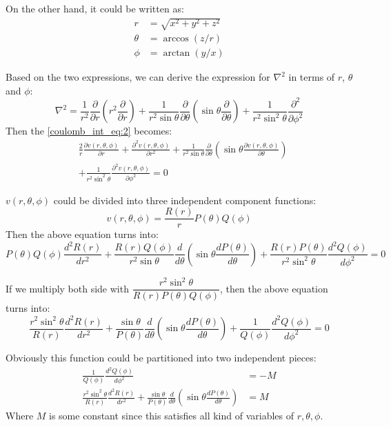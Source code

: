 On the other hand, it could be written as:
\begin{align}
 r &= \sqrt{x^{2} + y^{2} + z^{2}}  \nonumber \\
 \theta &= \arccos (z/r) \nonumber \\
 \phi   &= \arctan (y/x)
\end{align}

Based on the two expressions, we can derive the expression for $\nabla^{2}$
in terms of $r$, $\theta$ and $\phi$:
\begin{equation}
 \nabla^{2} = \frac{1}{r^{2}}\frac{\partial}{\partial r}(r^{2}
 \frac{\partial}{\partial r}) +
\frac{1}{r^{2}\sin \theta}\frac{\partial}{\partial \theta}
(\sin \theta \frac{\partial}{\partial \theta}) +
\frac{1}{r^{2}\sin^{2} \theta}\frac{\partial^{2}}{\partial \phi^{2}}
\end{equation}
Then the \ref{coulomb_int_eq:2} becomes:
\begin{align}
 &\frac{2}{r}\frac{\partial v(r,\theta,\phi)}{\partial r} +
 \frac{\partial^{2} v(r,\theta,\phi)}{\partial r^{2}} +
\frac{1}{r^{2}\sin \theta}\frac{\partial }{\partial \theta}
(\sin \theta \frac{\partial v(r,\theta,\phi)}{\partial \theta}) \nonumber \\
&+ \frac{1}{r^{2}\sin^{2} \theta}\frac{\partial^{2} v(r,\theta,\phi)}{\partial \phi^{2}} = 0
\end{align}

$v(r,\theta,\phi)$ could be divided into three independent component
functions:
\begin{equation}
 v(r,\theta,\phi) = \frac{R(r)}{r}P(\theta)Q(\phi)
\end{equation}
Then the above equation turns into:
\begin{equation}
 P(\theta)Q(\phi) \frac{d^{2} R(r)}{dr^{2}} +
 \frac{R(r)Q(\phi)}{r^{2}\sin \theta}\frac{d }{d \theta}
(\sin \theta \frac{d P(\theta)}{d \theta}) +
\frac{R(r)P(\theta)}{r^{2}\sin^{2} \theta}\frac{d^{2} Q(\phi)}{d \phi^{2}} = 0
\end{equation}

If we multiply both side with $\dfrac{r^{2}\sin^{2} \theta}{R(r)P(\theta)Q(\phi)}$,
then the above equation turns into:
\begin{equation}
\frac{r^{2}\sin^{2} \theta}{R(r)}\frac{d^{2} R(r)}{dr^{2}} +
\frac{\sin \theta}{P(\theta)}\frac{d }{d \theta}
(\sin \theta \frac{d P(\theta)}{d \theta}) +
\frac{1}{Q(\phi)}\frac{d^{2} Q(\phi)}{d \phi^{2}} = 0
\end{equation}

Obviously this function could be partitioned into two independent pieces:
\begin{align}
 \frac{1}{Q(\phi)}\frac{d^{2} Q(\phi)}{d \phi^{2}} &= -M \nonumber \\
\frac{r^{2}\sin^{2} \theta}{R(r)}\frac{d^{2} R(r)}{dr^{2}} +
\frac{\sin \theta}{P(\theta)}\frac{d }{d \theta}
(\sin \theta \frac{d P(\theta)}{d \theta}) &= M
\end{align}
Where $M$ is some constant since this satisfies all kind of variables
of $r, \theta, \phi$.


